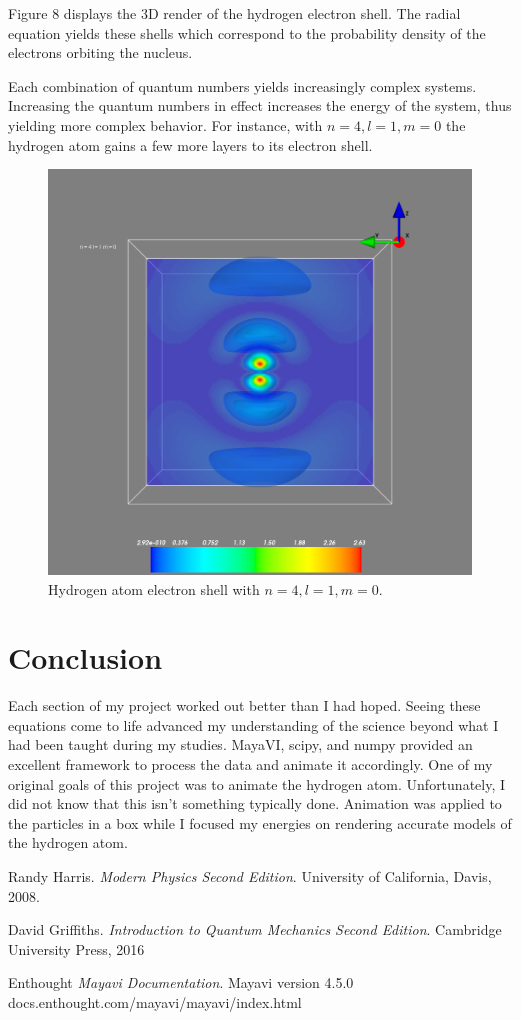 \documentclass[11pt]{article}
\begin{document}
Figure 8 displays the 3D render of the hydrogen electron shell. The radial equation yields these shells which correspond to the probability density of the electrons orbiting the nucleus. 

\newpage
Each combination of quantum numbers yields increasingly complex systems. Increasing the quantum numbers in effect increases the energy of the system, thus yielding more complex behavior. For instance, with $n = 4, l = 1, m = 0$ the hydrogen atom gains a few more layers to its electron shell. 

\begin{figure}
	\centering
	\includegraphics[width = .7\textwidth]{hydro410_cross}
	\caption{Hydrogen atom electron shell with $n = 4, l = 1, m = 0$.}
\end{figure}

\section{Conclusion}
Each section of my project worked out better than I had hoped. Seeing these equations come to life advanced my understanding of the science beyond what I had been taught during my studies. MayaVI, scipy, and numpy provided an excellent framework to process the data and animate it accordingly. One of my original goals of this project was to animate the hydrogen atom. Unfortunately, I did not know that this isn't something typically done. Animation was applied to the particles in a box while I focused my energies on rendering accurate models of the hydrogen atom. 

\newpage

\begin{thebibliography}{9}
Randy Harris. 
\textit{Modern Physics Second Edition}. 
University of California, Davis, 2008.

David Griffiths. 
\textit{Introduction to Quantum Mechanics Second Edition}. 
Cambridge University Press, 2016

Enthought 
\textit{Mayavi Documentation}. 
Mayavi version 4.5.0
docs.enthought.com/mayavi/mayavi/index.html


\end{thebibliography}
\end{document}
